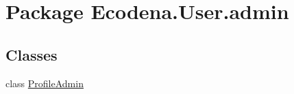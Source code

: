 \hypertarget{namespace_ecodena_1_1_user_1_1admin}{
\section{Package Ecodena.User.admin}
\label{d7/d0f/namespace_ecodena_1_1_user_1_1admin}
}
\subsection*{Classes}
\begin{DoxyCompactItemize}
\item 
class \hyperlink{class_ecodena_1_1_user_1_1admin_1_1_profile_admin}{ProfileAdmin}
\end{DoxyCompactItemize}
